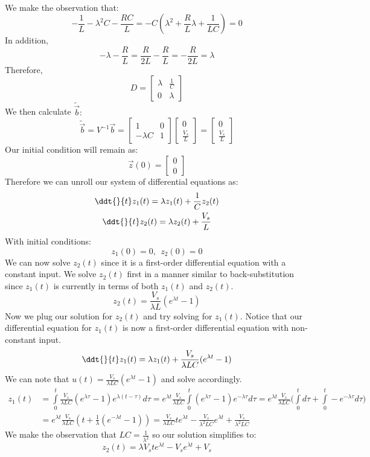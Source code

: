 {\begin{align*}
  \end{align*}
  We make the observation that:
  $$-\frac{1}{L} -\lambda^{2} C - \frac{RC}{L} = -C(\lambda^{2} + \frac{R}{L} \lambda + \frac{1}{LC}) = 0$$
  In addition,
  $$-\lambda - \frac{R}{L} = \frac{R}{2L} - \frac{R}{L} = -\frac{R}{2L} = \lambda$$
  Therefore,
  $$D = \begin{bmatrix} \lambda & \frac{1}{C} \\ 0 & \lambda \end{bmatrix}$$
  We then calculate $\widetilde{\vec{b}}:$
  $$\widetilde{\vec{b}} = V^{-1} \vec{b} = \begin{bmatrix} 1 & 0 \\ -\lambda C & 1 \end{bmatrix} \begin{bmatrix} 0 \\ \frac{V_s}{L} \end{bmatrix} = \begin{bmatrix} 0 \\ \frac{V_s}{L} \end{bmatrix}$$
  Our initial condition will remain as:
  $$\vec{z}(0) = \begin{bmatrix} 0 \\ 0 \end{bmatrix}$$
  Therefore we can unroll our system of differential equations as:
  \begin{gather*}
  \ddt{}{t} z_{1}(t) = \lambda z_{1}(t) + \frac{1}{C} z_{2}(t) \\
  \ddt{}{t} z_{2}(t) = \lambda z_{2}(t) + \frac{V_s}{L} \\
  \end{gather*}
  With initial conditions:
  $$z_{1}(0) = 0, \ \  z_{2}(0) = 0$$
  We can now solve $z_{2}(t)$ since it is a first-order differential equation with a constant input. 
  We solve $z_{2}(t)$ first in a manner similar to back-substitution since $z_{1}(t)$ is currently in terms of both $z_{1}(t)$ and $z_{2}(t).$
  $$z_{2}(t) = \frac{V_s}{\lambda L} (e^{\lambda t} - 1)$$
  Now we plug our solution for $z_{2}(t)$ and try solving for $z_{1}(t).$ 
  Notice that our differential equation for $z_{1}(t)$ is now a first-order differential equation with non-constant input.
  $$\ddt{}{t} z_{1}(t) = \lambda z_{1}(t) + \frac{V_s}{\lambda LC} (e^{\lambda t} - 1)$$
  We can note that $u(t) = \frac{V_s}{\lambda LC} (e^{\lambda t} - 1)$ and solve accordingly.
  \begin{align*}
  z_{1}(t) &= \int\limits_{0}^t \frac{V_s}{\lambda LC} (e^{\lambda \tau} - 1) e^{\lambda(t - \tau)} d\tau = 
  e^{\lambda t} \frac{V_s}{\lambda LC} \int\limits_{0}^t (e^{\lambda \tau} - 1) e^{- \lambda \tau} d\tau 
  = e^{\lambda t} \frac{V_s}{\lambda LC} \big(\int\limits_{0}^t d\tau + \int\limits_{0}^t -e^{-\lambda \tau} d\tau \big) \\
  &= e^{\lambda t} \frac{V_s}{\lambda LC} (t + \frac{1}{\lambda}(e^{-\lambda t} - 1)) = \frac{V_s}{\lambda LC} t e^{\lambda t} - \frac{V_s}{\lambda^2 LC} e^{\lambda t} + \frac{V_s}{\lambda^2 LC}
  \end{align*}
  We make the observation that $LC = \frac{1}{\lambda^2}$ so our solution simplifies to:
  $$z_{2}(t) = \lambda V_s t e^{\lambda t} - V_s e^{\lambda t} + V_s$$

}
